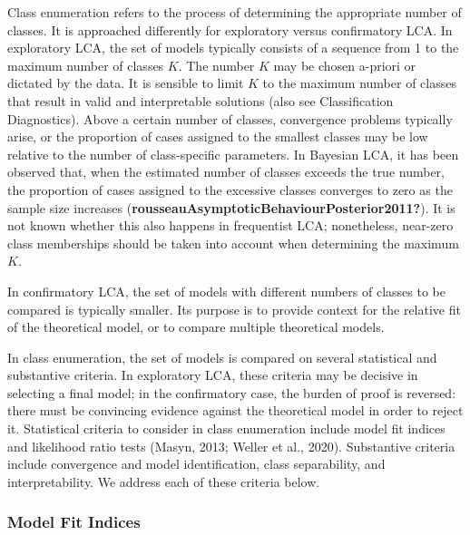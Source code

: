 \documentclass[
  ,man,floatsintext]{apa6}
\begin{document}
Class enumeration refers to the process of determining the appropriate
number of classes. It is approached differently for exploratory versus
confirmatory LCA. In exploratory LCA, the set of models typically
consists of a sequence from 1 to the maximum number of classes \(K\). The
number \(K\) may be chosen a-priori or dictated by the data. It is
sensible to limit \(K\) to the maximum number of classes that result in
valid and interpretable solutions (also see Classification Diagnostics).
Above a certain number of classes, convergence problems typically arise,
or the proportion of cases assigned to the smallest classes may be low
relative to the number of class-specific parameters. In Bayesian LCA, it
has been observed that, when the estimated number of classes exceeds the
true number, the proportion of cases assigned to the excessive classes
converges to zero as the sample size increases
(\textbf{rousseauAsymptoticBehaviourPosterior2011?}). It is not known whether
this also happens in frequentist LCA; nonetheless, near-zero class
memberships should be taken into account when determining the maximum
\(K\).

In confirmatory LCA, the set of models with different numbers of classes
to be compared is typically smaller. Its purpose is to provide context
for the relative fit of the theoretical model, or to compare multiple
theoretical models.

In class enumeration, the set of models is compared on several
statistical and substantive criteria. In exploratory LCA, these criteria
may be decisive in selecting a final model; in the confirmatory case,
the burden of proof is reversed: there must be convincing evidence
against the theoretical model in order to reject it. Statistical
criteria to consider in class enumeration include model fit indices and
likelihood ratio tests (Masyn, 2013; Weller et al., 2020).
Substantive criteria include convergence and model identification, class
separability, and interpretability. We address each of these criteria
below.

\hypertarget{model-fit-indices}{%
\subsubsection{Model Fit Indices}\label{model-fit-indices}}
\end{document}
